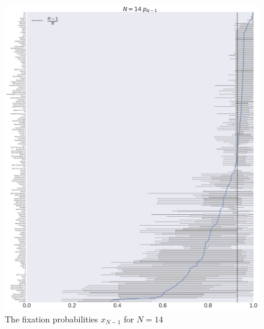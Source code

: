\documentclass[10pt,letterpaper]{article}
\begin{document}
\begin{figure}[!hbtp]
    \centering
    \includegraphics[width=\textwidth]{./boxplot_14_resist.pdf}
    \caption{The fixation probabilities \(x_{N-1}\) for \(N=14\)}
    \label{resistance-14}
\end{figure}
\end{document}

